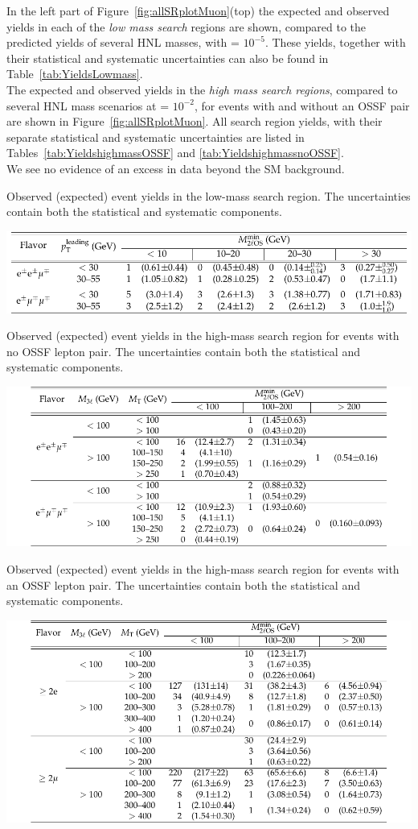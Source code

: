 In the left part of Figure~\ref{fig:allSRplotMuon}(top) 
the expected and observed yields in each of the \emph{low mass search}
regions are shown, compared to the predicted yields of several HNL masses, with \mixpar = $10^{-5}$. These yields, together with their
statistical and systematic uncertainties can also be found in
Table~\ref{tab:YieldsLowmass}.  \\
The expected and observed yields in the \emph{high mass search regions},
compared to several HNL mass scenarios at \mixpar = $10^{-2}$, for
events with and without an OSSF pair are shown in
Figure~\ref{fig:allSRplotMuon}. All search region yields, with their
separate statistical and systematic uncertainties are listed in
Tables~\ref{tab:YieldshighmassOSSF} and
\ref{tab:YieldshighmassnoOSSF}. \\
We see no evidence of an excess in data beyond the SM background.
\small{
\begin{table}[h]
\centering
\caption{Observed (expected) event yields in the low-mass search region. The uncertainties
contain both the statistical and systematic components.}
\label{tab:YieldsLowmass}
\includegraphics[width=0.65\linewidth]{Figures/c5/tables/CMS-EXO-17-012_Table_0A1.pdf}
\end{table}
\begin{table}[h]
\centering
\caption{Observed (expected) event yields in the high-mass search region for events with no
OSSF lepton pair. The uncertainties contain both the statistical and systematic components.}
\label{tab:YieldshighmassOSSF}
\includegraphics[width=0.7\linewidth]{Figures/c5/tables/CMS-EXO-17-012_Table_0A2.pdf}
\end{table}
\begin{table}[h]
\centering
\caption{Observed (expected) event yields in the high-mass search region for events with an
OSSF lepton pair. The uncertainties contain both the statistical and systematic components.}
\label{tab:YieldshighmassnoOSSF}
\includegraphics[width=0.7\linewidth]{Figures/c5/tables/CMS-EXO-17-012_Table_0A3.pdf}
\end{table}
}
